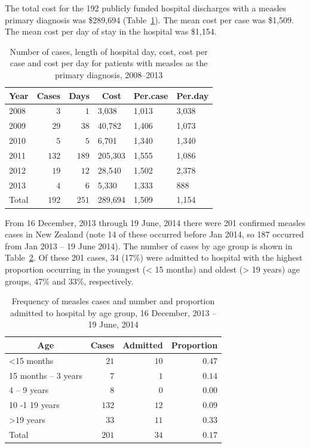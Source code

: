 \documentclass{article}
\begin{document}
{The total cost for the 192 publicly funded hospital discharges with a measles primary diagnosis was \$289,694 (Table~\ref{table:hosp}). The mean cost per case was \$1,509. The mean cost per day of stay in the hospital was \$1,154.


\begin{table}
\caption{Number of cases, length of hospital day, cost, cost per case and cost per day for patients with measles as the primary diagnosis, 2008--2013}
\begin{center}
\begin{tabular}{lrrlll}
\hline\hline
\multicolumn{1}{c}{Year}&\multicolumn{1}{c}{Cases}&\multicolumn{1}{c}{Days}&\multicolumn{1}{c}{Cost}&\multicolumn{1}{c}{Per.case}&\multicolumn{1}{c}{Per.day}\tabularnewline
\hline
2008&$  3$&$  1$&3,038&1,013&3,038\tabularnewline
2009&$ 29$&$ 38$&40,782&1,406&1,073\tabularnewline
2010&$  5$&$  5$&6,701&1,340&1,340\tabularnewline
2011&$132$&$189$&205,303&1,555&1,086\tabularnewline
2012&$ 19$&$ 12$&28,540&1,502&2,378\tabularnewline
2013&$  4$&$  6$&5,330&1,333&888\tabularnewline
Total&$192$&$251$&289,694&1,509&1,154\tabularnewline
\hline
\end{tabular}\end{center}\label{table:hosp}
\end{table}

From 16 December, 2013 through 19 June, 2014 there were 201 confirmed measles cases in New Zealand (note 14 of these occurred before Jan 2014, so 187 occurred from Jan 2013 -- 19 June 2014). The number of cases by age group is shown in Table~\ref{table:freq}. Of these 201 cases, 34 (17\%) were admitted to hospital with the highest proportion occurring in the youngest (< 15 months) and oldest (> 19 years) age groups, 47\% and 33\%, respectively.


\begin{table}
\caption{Frequency of measles cases and number and proportion admitted to hospital by age group, 16 December, 2013 -- 19 June, 2014}
\begin{center}
\begin{tabular}{lrrr}
\hline\hline
\multicolumn{1}{c}{Age}&\multicolumn{1}{c}{Cases}&\multicolumn{1}{c}{Admitted}&\multicolumn{1}{c}{Proportion}\tabularnewline
\hline
\textless  15 months&$ 21$&$10$&$0.47$\tabularnewline
15 months – 3 years&$  7$&$ 1$&$0.14$\tabularnewline
4 – 9 years&$  8$&$ 0$&$0.00$\tabularnewline
10 -1 19 years&$132$&$12$&$0.09$\tabularnewline
\textgreater  19 years&$ 33$&$11$&$0.33$\tabularnewline
Total&$201$&$34$&$0.17$\tabularnewline
\hline
\end{tabular}\end{center}\label{table:freq}
\end{table}

}
\end{document}
